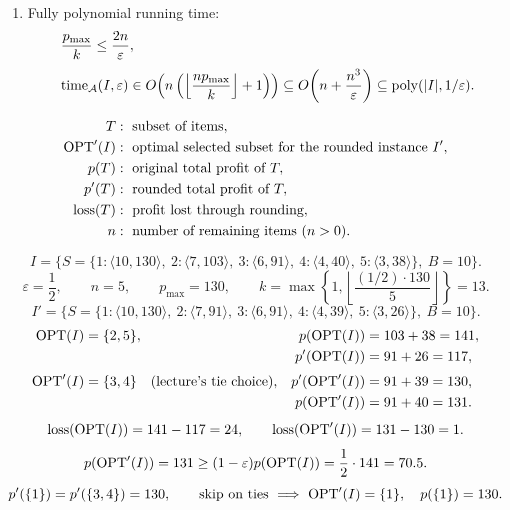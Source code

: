 \documentclass[12pt,a4paper]{article}
\begin{document}
\begin{remark}
\begin{enumerate}
\[\qquad k=1\ \Longrightarrow\ p_i'=p_i\ \Longrightarrow\ \mathrm{loss}(T)=0.
\]
\item Fully polynomial running time:
\[
\begin{aligned}
&\frac{p_{\max}}k\leq\frac{2n}{\varepsilon},\\[3pt]
&\mathrm{time}_{\mathcal A}(I,\varepsilon)
\in O\!\left(n\left(\left\lfloor\frac{np_{\max}}k\right\rfloor+1\right)\right)
\subseteq O\!\left(n+\frac{n^3}{\varepsilon}\right)
\subseteq\operatorname{poly}(|I|,1/\varepsilon).
\end{aligned}
\]
\end{enumerate}
\[
\begin{aligned}
T&:\text{ subset of items},\\
\operatorname{OPT}'(I)&:\text{ optimal selected subset for the rounded instance }I',\\
p(T)&:\text{ original total profit of }T,\\
p'(T)&:\text{ rounded total profit of }T,\\
\mathrm{loss}(T)&:\text{ profit lost through rounding},\\
n&:\text{ number of remaining items (}n>0\text{)}.
\end{aligned}
\]
\end{remark}

\noindent\begin{minipage}{\linewidth}
\begin{example}
\[
I=\{S=\{1:\langle10,130\rangle,\ 2:\langle7,103\rangle,\ 3:\langle6,91\rangle,\
4:\langle4,40\rangle,\ 5:\langle3,38\rangle\},\ B=10\}.
\]
\[
\varepsilon=\frac12,\qquad n=5,\qquad p_{\max}=130,\qquad
k=\max\left\{1,\left\lfloor\frac{(1/2)\cdot130}{5}\right\rfloor\right\}=13.
\]
\[
I'=\{S=\{1:\langle10,130\rangle,\ 2:\langle7,91\rangle,\ 3:\langle6,91\rangle,\
4:\langle4,39\rangle,\ 5:\langle3,26\rangle\},\ B=10\}.
\]
\[
\begin{aligned}
\operatorname{OPT}(I)&=\{2,5\},&p(\operatorname{OPT}(I))&=103+38=141,\\
&&p'(\operatorname{OPT}(I))&=91+26=117,\\[3pt]
\operatorname{OPT}'(I)&=\{3,4\}\quad\text{(lecture's tie choice)},&
p'(\operatorname{OPT}'(I))&=91+39=130,\\
&&p(\operatorname{OPT}'(I))&=91+40=131.
\end{aligned}
\]
\[
\mathrm{loss}(\operatorname{OPT}(I))=141-117=24,\qquad
\mathrm{loss}(\operatorname{OPT}'(I))=131-130=1.
\]
\[
p(\operatorname{OPT}'(I))=131\geq(1-\varepsilon)p(\operatorname{OPT}(I))=\frac12\cdot141=70.5.
\]
\[
p'(\{1\})=p'(\{3,4\})=130,\qquad
\text{skip on ties}\ \Longrightarrow\ \operatorname{OPT}'(I)=\{1\},\quad p(\{1\})=130.
\]
\end{example}
\end{minipage}\par
\end{document}
